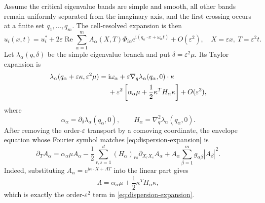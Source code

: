 \documentclass[11pt]{article}
\newcommand{\ii}{\mathrm{i}}
\newcommand{\ee}{\mathrm{e}}
\newcommand{\RePart}{\operatorname{Re}}
\begin{document}
Assume the critical eigenvalue bands are simple and smooth, all other bands
remain uniformly separated from the imaginary axis, and the first crossing
occurs at a finite set $q_1,\ldots,q_m$.  The cell-resolved expansion is then
\begin{equation}
 u_i(x,t)=u_i^*+2\varepsilon\RePart\sum_{\alpha=1}^m
 A_\alpha(X,T)\Phi_{i\alpha}
 \ee^{\ii(q_\alpha\cdot x+\omega_\alpha t)}+O(\varepsilon^2),
 \quad X=\varepsilon x,\ T=\varepsilon^2t.
 \label{eq:Rd-envelope-ansatz}
\end{equation}
Let $\lambda_\alpha(q,\delta)$ be the simple eigenvalue branch and put
$\delta=\varepsilon^2\mu$.  Its Taylor expansion is
\begin{align}
 \lambda_\alpha(q_\alpha+\varepsilon\kappa,\varepsilon^2\mu)
 ={}&\ii\omega_\alpha
 +\varepsilon\nabla_q\lambda_\alpha(q_\alpha,0)\cdot\kappa\notag\\
 &+\varepsilon^2\left[
 \alpha_\alpha\mu+\frac12\kappa^TH_\alpha\kappa\right]
 +O(\varepsilon^3),
 \label{eq:dispersion-expansion}
\end{align}
where
\begin{equation}
 \alpha_\alpha=\partial_\delta\lambda_\alpha(q_\alpha,0),
 \qquad H_\alpha=\nabla_q^2\lambda_\alpha(q_\alpha,0).
\end{equation}
After removing the order-$\varepsilon$ transport by a comoving coordinate,
the envelope equation whose Fourier symbol matches
\eqref{eq:dispersion-expansion} is
\begin{equation}
 \partial_TA_\alpha=\alpha_\alpha\mu A_\alpha
 -\frac12\sum_{r,s=1}^d(H_\alpha)_{rs}
 \partial_{X_rX_s}A_\alpha
 +A_\alpha\sum_{\beta=1}^m
 g_{\alpha\beta}|A_\beta|^2.
 \label{eq:high-dimensional-CGL}
\end{equation}
Indeed, substituting $A_\alpha=\ee^{\ii\kappa\cdot X+\Lambda T}$ into the
linear part gives
\begin{equation}
 \Lambda=\alpha_\alpha\mu+\frac12\kappa^TH_\alpha\kappa,
\end{equation}
which is exactly the order-$\varepsilon^2$ term in
\eqref{eq:dispersion-expansion}.
\end{document}
